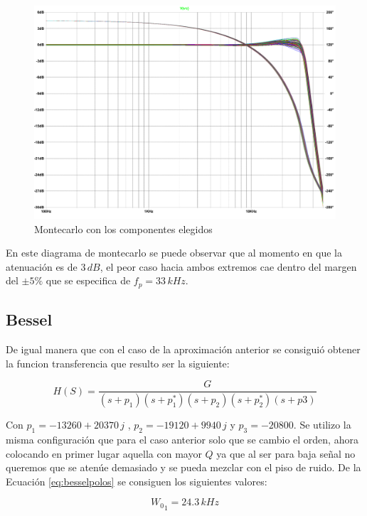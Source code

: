 \begin{figure}[H]
	\centering
	\includegraphics[scale=0.5]{../Ex1/Informe/montecarlolegendre.pdf}
	\caption{Montecarlo con los componentes elegidos}
	\label{fig:montecarlolegendre}
\end{figure}

	En este diagrama de montecarlo se puede observar que al momento en que la atenuación es de $3 \, dB$, el peor caso hacia ambos extremos cae dentro del margen del $\pm 5 \%$ que se especifica de $f_p = 33 \, kHz$.

\subsection{Bessel}
	De igual manera que con el caso de la aproximación anterior se consiguió obtener la funcion transferencia que resulto ser la siguiente:

\begin{equation}
	H(S) = \dfrac{G}{(s+p_1)(s+p_1^*)(s+p_2)(s+p_2^*)(s+p3)}
\label{eq:besselpolos}
\end{equation}

	Con $p_1 = -13260 + 20370 \, j$ , $p_2 = -19120 + 9940 \,j$ y $p_3 = -20800$.
	Se utilizo la misma configuración que para el caso anterior solo que se cambio el orden, ahora colocando en primer lugar aquella con mayor $Q$ ya que al ser para baja señal no queremos que se atenúe demasiado y se pueda mezclar con el piso de ruido.
	De la Ecuación \eqref{eq:besselpolos} se consiguen los siguientes valores:

\begin{equation}
	{W_0}_1 = 24.3 \, kHz
\label{eq:wo1Bessel}
\end{equation}

